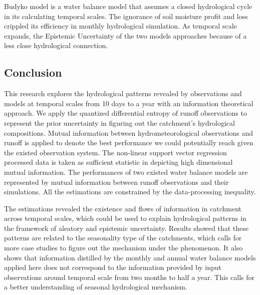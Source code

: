 \documentclass[11pt]{article}
\begin{document}
Budyko model is a water balance model that assumes a closed hydrological cycle in its calculating temporal scales. The ignorance of soil moisture profit and loss crippled its efficiency in monthly hydrological simulation. As temporal scale expands, the Epistemic Uncertainty of the two models approaches because of a less close hydrological connection.

  

 
\fi
\newpage
\begin{center}
\section{Conclusion}
\end{center}

This research explores the hydrological patterns revealed by observations and models at temporal scales from 10 days to a year with an information theoretical approach. We apply the quantized differential entropy of runoff observations to represent the prior uncertainty in figuring out the catchment's hydrological compositions. Mutual information between hydrometeorological observations and runoff is applied to denote the best performance we could potentially reach given the existed observation system. The non-linear support vector regression processed data is taken as sufficient statistic in depicting  high dimensional mutual information.
The performances of two existed water balance models are represented by mutual information between runoff observations and their simulations. All the estimations are constrained by the  data-processing inequality. 

The estimations revealed the existence and flows of information in catchment across temporal scales, which could be used to explain hydrological patterns in the framework of aleatory and epistemic uncertainty. Results showed that these patterns are related to the seasonality type of the catchments, which calls for more case studies to figure out the mechanism under the phenomenon. It also shows that information distilled by the monthly and annual water balance models applied here does not correspond to the information provided by input observations around temporal scale from two months to half a year. This calls for a better understanding of seasonal hydrological mechanism.  
\end{document}
